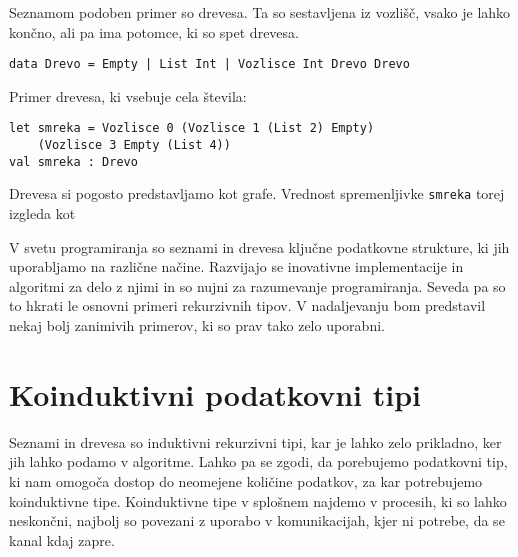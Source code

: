 \documentclass[12pt,a4paper,openany]{book}
\begin{document}
Seznamom podoben primer so drevesa. Ta so sestavljena iz vozlišč, vsako je lahko končno, ali pa ima potomce, ki so spet drevesa.
\begin{lstlisting}
data Drevo = Empty | List Int | Vozlisce Int Drevo Drevo
\end{lstlisting}
Primer drevesa, ki vsebuje cela števila:
\begin{lstlisting}
let smreka = Vozlisce 0 (Vozlisce 1 (List 2) Empty)
    (Vozlisce 3 Empty (List 4))
val smreka : Drevo
\end{lstlisting}
Drevesa si pogosto predstavljamo kot grafe. Vrednost spremenljivke \lstinline{smreka} torej izgleda kot
\begin{center} 
\end{center}

V svetu programiranja so seznami in drevesa ključne podatkovne strukture, ki jih uporabljamo na različne načine. Razvijajo se inovativne implementacije in algoritmi za delo z njimi in so nujni za razumevanje programiranja.
Seveda pa so to hkrati le osnovni primeri rekurzivnih tipov. V nadaljevanju bom predstavil nekaj bolj zanimivih primerov, ki so prav tako zelo uporabni.

\section{Koinduktivni podatkovni tipi}
Seznami in drevesa so induktivni rekurzivni tipi, kar je lahko zelo prikladno, ker jih lahko podamo v algoritme. Lahko pa se zgodi, da porebujemo podatkovni tip, ki nam omogoča dostop do 
neomejene količine podatkov, za kar potrebujemo koinduktivne tipe. Koinduktivne tipe v splošnem najdemo v procesih, ki so lahko neskončni, najbolj so povezani z uporabo v komunikacijah, kjer ni potrebe, da se kanal kdaj zapre.
\end{document}
